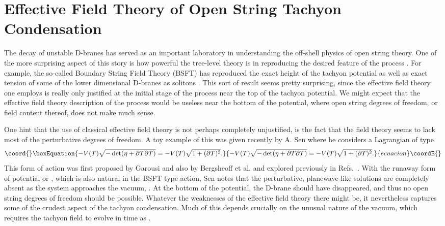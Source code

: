 \documentclass[a4paper,12pt]{article}
\begin{document}
\setcounter{footnote}{0}


\pagebreak
\renewcommand{\thepage}{\arabic{page}}
\pagebreak

\setcounter{equation}{0}

\section{Effective Field Theory of Open String Tachyon Condensation}

The decay of unstable D-branes \cite{DaD} has served as an important
laboratory  
in understanding the  off-shell physics of open string theory. One of
the  more
surprising aspect of this story is how powerful the tree-level
theory is in reproducing the desired feature of the process \cite{emil}. 
For example, the 
so-called Boundary String Field Theory (BSFT) \cite{BSFT, BSFTo} 
has reproduced the exact height of the tachyon potential as 
well as exact tension of some of the lower dimensional D-branes as 
solitons \cite{GS, kutasov}. 
This sort of result seems pretty surprising, since the effective
field theory one employs is really only  justified at the initial stage 
of the process near the top of the tachyon potential. We might expect
 that the effective field theory description of
the process would be useless near the bottom of the potential, 
where open string degrees of freedom, or field content thereof, 
does not make much sense. 

One hint that the use of classical effective field theory is not perhaps 
completely unjustified, is the fact that the field theory seems
to lack most of the  perturbative degrees of freedom. A toy example
of this was given recently by A. Sen \cite{rolling} where he considers a 
Lagrangian of type
\begin{equation}\coord{}\boxEquation{
-V(T)\sqrt{-\det(\eta+\partial T\partial T)}
=-V(T)\sqrt{1+(\partial T)^2}.
}{
-V(T)\sqrt{-\det(\eta+\partial T\partial T)}
=-V(T)\sqrt{1+(\partial T)^2}.
}{ecuacion}\coordE{}\end{equation}
This form of action was first proposed by Garousi and also by 
Bergsheoff et al.\cite{bergshoeff} and 
explored previously in Refs.\ \cite{kluson,fluid}.
With the runaway form of potential \coordHE{} or \coordHE{},
which is also natural in the BSFT type action,
Sen notes that the perturbative, planewave-like solutions are completely
absent as the system approaches the vacuum, \coordHE{}. At the bottom
of the potential, the D-brane should have disappeared, and thus no
open string degrees of freedom should be possible. Whatever the 
weaknesses  of
the effective field theory there might be, it nevertheless  captures
some of 
the crudest aspect of the tachyon condensation. Much of this depends
crucially on the unusual nature of the vacuum, which requires the
tachyon field to evolve in time as \coordHE{}.
\end{document}
